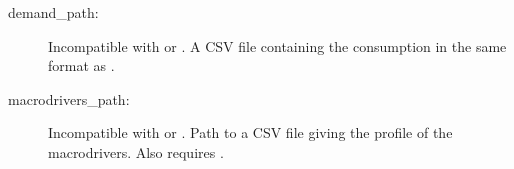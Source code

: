 \documentclass[letterpaper,10pt,english]{sphinxmanual}
\begin{document}
\label{\detokenize{inputs/toml:preset-demand}}\begin{description}
\item[{demand\_path:}] \leavevmode
Incompatible with {\hyperref[\detokenize{inputs/toml:preset-consumption}]{}} or
{\hyperref[\detokenize{inputs/toml:preset-macro}]{}}. A CSV file containing the consumption in the
same format as {\hyperref[\detokenize{inputs/projections:inputs-projection}]{}}.

\end{description}
\label{\detokenize{inputs/toml:preset-macro}}\begin{description}
\item[{macrodrivers\_path:}] \leavevmode
Incompatible with {\hyperref[\detokenize{inputs/toml:preset-consumption}]{}} or
{\hyperref[\detokenize{inputs/toml:preset-demand}]{}}. Path to a CSV file giving the profile of the
macrodrivers. Also requires {\hyperref[\detokenize{inputs/toml:preset-regression}]{}}.

\end{description}
\end{document}
